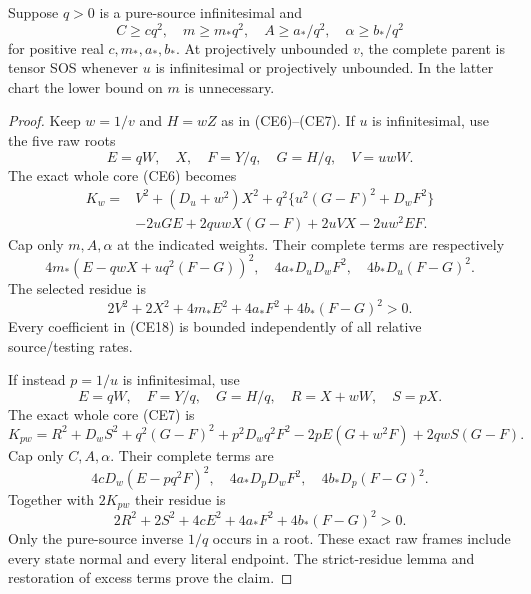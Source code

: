 \begin{lemma}
Suppose $q>0$ is a pure-source infinitesimal and
\[
 C\ge c q^2,\quad m\ge m_*q^2,\quad
 A\ge a_*/q^2,\quad\alpha\ge b_*/q^2
                                                        \tag{CE17}
\]
for positive real $c,m_*,a_*,b_*$. At projectively unbounded $v$,
the complete parent is tensor SOS whenever $u$ is infinitesimal or
projectively unbounded. In the latter chart the lower bound on $m$
is unnecessary.
\end{lemma}
\begin{proof}
Keep $w=1/v$ and $H=wZ$ as in (CE6)--(CE7). If $u$ is infinitesimal,
use the five raw roots
\[
 E=qW,\quad X,\quad F=Y/q,\quad G=H/q,\quad V=uwW.
\]
The exact whole core (CE6) becomes
\begin{align*}
 K_w={}&V^2+(D_u+w^2)X^2
       +q^2\{u^2(G-F)^2+D_wF^2\}\\
 &-2uGE+2quwX(G-F)+2uVX-2uw^2EF.             \tag{CE18}
\end{align*}
Cap only $m,A,\alpha$ at the indicated weights. Their complete terms
are respectively
\[
 4m_*(E-qwX+uq^2(F-G))^2,\quad
 4a_*D_uD_wF^2,\quad4b_*D_u(F-G)^2.
\]
The selected residue is
\[
 2V^2+2X^2+4m_*E^2+4a_*F^2+4b_*(F-G)^2>0.   \tag{CE19}
\]
Every coefficient in (CE18) is bounded independently of all relative
source/testing rates.

If instead $p=1/u$ is infinitesimal, use
\[
 E=qW,\quad F=Y/q,\quad G=H/q,\quad
 R=X+wW,\quad S=pX.
\]
The exact whole core (CE7) is
\[
 K_{pw}=R^2+D_wS^2+q^2(G-F)^2+p^2D_wq^2F^2
       -2pE(G+w^2F)+2qwS(G-F).               \tag{CE20}
\]
Cap only $C,A,\alpha$. Their complete terms are
\[
 4cD_w(E-pq^2F)^2,\quad4a_*D_pD_wF^2,
 \quad4b_*D_p(F-G)^2.
\]
Together with $2K_{pw}$ their residue is
\[
 2R^2+2S^2+4cE^2+4a_*F^2+4b_*(F-G)^2>0.     \tag{CE21}
\]
Only the pure-source inverse $1/q$ occurs in a root. These exact raw
frames include every state normal and every literal endpoint. The
strict-residue lemma and restoration of excess terms prove the claim.
\end{proof}


